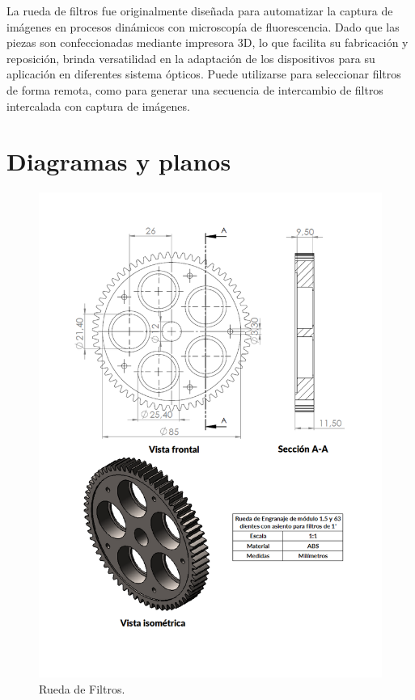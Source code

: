 \documentclass{article}
\begin{document}
La rueda de filtros fue originalmente diseñada para automatizar la captura de imágenes en procesos dinámicos con microscopía de fluorescencia. Dado que las piezas son confeccionadas mediante impresora 3D, lo que facilita su fabricación y reposición, brinda versatilidad en la adaptación de los dispositivos para su aplicación en diferentes sistema ópticos. Puede utilizarse para seleccionar filtros de forma remota, como para generar una secuencia de intercambio de filtros intercalada con captura de imágenes.

\section*{Diagramas y planos}
\begin{figure}[ht]
\centering
\includegraphics[height=0.72\textheight]{PlanoRueda.pdf}
\caption{Rueda de Filtros.}
\end{figure}
\end{document}
